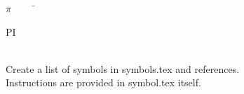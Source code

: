 
\begin{tabbing}
$\pi$~~~~~\=\parbox{5in}{PI\dotfill \pageref{symbol:pi}}\\
Create a list of symbols in symbols.tex and references.\\
Instructions are provided in symbol.tex itself.
\end{tabbing}
\newpage
